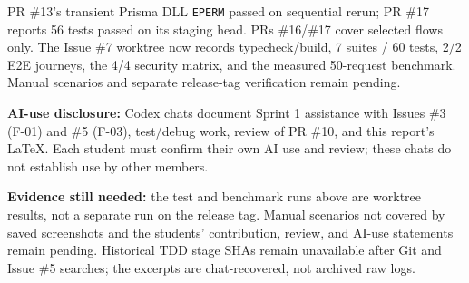 \documentclass[12pt,a4paper]{article}
\begin{document}
{\small
PR \#13's transient Prisma DLL \texttt{EPERM} passed on sequential rerun; PR \#17 reports 56 tests passed on its staging head. PRs \#16/\#17 cover selected flows only. The Issue \#7 worktree now records typecheck/build, 7 suites / 60 tests, 2/2 E2E journeys, the 4/4 security matrix, and the measured 50-request benchmark. Manual scenarios and separate release-tag verification remain pending.

\textbf{AI-use disclosure:} Codex chats document Sprint 1 assistance with Issues \#3 (F-01) and \#5 (F-03), test/debug work, review of PR \#10, and this report's LaTeX. Each student must confirm their own AI use and review; these chats do not establish use by other members.

\textbf{Evidence still needed:} the test and benchmark runs above are worktree results, not a separate run on the release tag. Manual scenarios not covered by saved screenshots and the students' contribution, review, and AI-use statements remain pending. Historical TDD stage SHAs remain unavailable after Git and Issue \#5 searches; the excerpts are chat-recovered, not archived raw logs.
}
\label{part-f-end}
\end{document}
